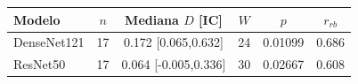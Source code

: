 \begin{tabular}{lccccc}
\toprule
Modelo & $n$ & Mediana $D$ [IC] & $W$ & $p$ & $r_{rb}$\\
\midrule
DenseNet121 & 17 & 0.172 [0.065,0.632] & 24 & 0.01099 & 0.686\\
ResNet50 & 17 & 0.064 [-0.005,0.336] & 30 & 0.02667 & 0.608\\
\bottomrule
\end{tabular}
